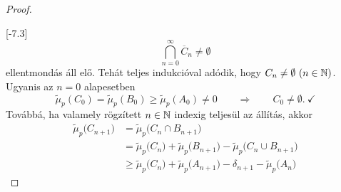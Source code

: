 \documentclass[
]{elteikthesis}[2024/04/26]
\begin{document}
\begin{proof}
{\begin{theo*}
			\end{theo*}
		}[-7.3\baselineskip]
		\[
			\bigcap_{n=0}^{\infty} \overline{C}_n \neq \emptyset
		\]
		ellentmondás áll elő.
		Tehát teljes indukcióval adódik, hogy \( C_n \neq \emptyset \ (n \in \mathbb{N}) \).
		Ugyanis az \( n = 0 \) alapesetben
		\[
			\widetilde{\mu}_p( C_0 ) = 
			\widetilde{\mu}_p( B_0 ) \geq 
			\widetilde{\mu}_p( A_0 ) \neq 0
			\qquad \Longrightarrow \qquad
			C_0 \neq \emptyset. \ \checkmark
		\]
		Továbbá, ha valamely rögzített \( n \in \mathbb{N} \) indexig teljesül az állítás, akkor
		\begin{align*}
			\widetilde{\mu}_p \bigl( C_{n + 1} \bigr)
			&= \widetilde{\mu}_p \bigl( C_n \cap B_{n + 1} \bigr) \\[3pt]
			&= \widetilde{\mu}_p \bigl( C_n \bigr) + 
			   \widetilde{\mu}_p \bigl( B_{n + 1} \bigr) - 
			   \widetilde{\mu}_p \bigl( C_n \cup B_{n + 1} \bigr) \\[3pt]
			&\geq \widetilde{\mu}_p \bigl( C_n \bigr) +
			      \widetilde{\mu}_p \bigl( A_{n + 1} \bigr) - \delta_{n + 1} -
			      \widetilde{\mu}_p \bigl( A_n \bigr)
		\end{align*}
		
	\end{proof}
	
\end{document}
